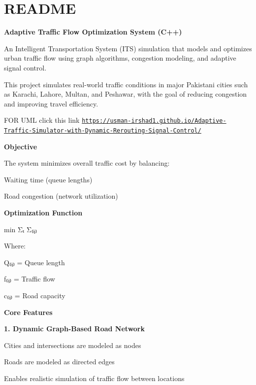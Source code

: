 \chapter{README }
\hypertarget{md__r_e_a_d_m_e}{}\label{md__r_e_a_d_m_e}
{\bfseries{Adaptive Traffic Flow Optimization System (C++)}}

An Intelligent Transportation System (ITS) simulation that models and optimizes urban traffic flow using graph algorithms, congestion modeling, and adaptive signal control.

This project simulates real-\/world traffic conditions in major Pakistani cities such as Karachi, Lahore, Multan, and Peshawar, with the goal of reducing congestion and improving travel efficiency.

FOR UML click this link \href{https://usman-irshad1.github.io/Adaptive-Traffic-Simulator-with-Dynamic-Rerouting-Signal-Control/}{\texttt{https:\+/\+/\+usman-\/irshad1.\+github.\+io/\+\+Adaptive-\/\+Traffic-\/\+Simulator-\/with-\/\+Dynamic-\/\+Rerouting-\/\+Signal-\/\+Control/\+}}

{\bfseries{Objective}}

The system minimizes overall traffic cost by balancing:\+


\begin{DoxyItemize}
\item Waiting time (queue lengths)
\item Road congestion (network utilization)
\end{DoxyItemize}

{\bfseries{Optimization Function}}

min Σₜ Σ₍ᵢⱼ₎ \+[ α Q₍ᵢⱼ₎(t) + β (f₍ᵢⱼ₎(t) /\+ c₍ᵢⱼ₎)² ]\+

Where:\+

Q₍ᵢⱼ₎ = Queue length

f₍ᵢⱼ₎ = Traffic flow

c₍ᵢⱼ₎ = Road capacity

{\bfseries{Core Features}}

{\bfseries{1. Dynamic Graph-\/\+Based Road Network}}


\begin{DoxyItemize}
\item Cities and intersections are modeled as nodes
\item Roads are modeled as directed edges
\item Enables realistic simulation of traffic flow between locations
\end{DoxyItemize}

